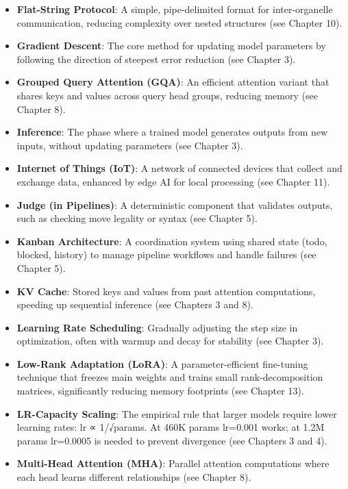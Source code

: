 \documentclass[
]{article}
\begin{document}
\begin{itemize}
  that processes features after attention, using ReLU activation (see
  Chapter 2).
\item
  \textbf{Flat-String Protocol}: A simple, pipe-delimited format for
  inter-organelle communication, reducing complexity over nested
  structures (see Chapter 10).
\item
  \textbf{Gradient Descent}: The core method for updating model
  parameters by following the direction of steepest error reduction (see
  Chapter 3).
\item
  \textbf{Grouped Query Attention (GQA)}: An efficient attention variant
  that shares keys and values across query head groups, reducing memory
  (see Chapter 8).
\item
  \textbf{Inference}: The phase where a trained model generates outputs
  from new inputs, without updating parameters (see Chapter 3).
\item
  \textbf{Internet of Things (IoT)}: A network of connected devices that
  collect and exchange data, enhanced by edge AI for local processing
  (see Chapter 11).
\item
  \textbf{Judge (in Pipelines)}: A deterministic component that
  validates outputs, such as checking move legality or syntax (see
  Chapter 5).
\item
  \textbf{Kanban Architecture}: A coordination system using shared state
  (todo, blocked, history) to manage pipeline workflows and handle
  failures (see Chapter 5).
\item
  \textbf{KV Cache}: Stored keys and values from past attention
  computations, speeding up sequential inference (see Chapters 3 and 8).
\item
  \textbf{Learning Rate Scheduling}: Gradually adjusting the step size
  in optimization, often with warmup and decay for stability (see
  Chapter 3).
\item
  \textbf{Low-Rank Adaptation (LoRA)}: A parameter-efficient fine-tuning
  technique that freezes main weights and trains small
  rank-decomposition matrices, significantly reducing memory footprints
  (see Chapter 13).
\item
  \textbf{LR-Capacity Scaling}: The empirical rule that larger models
  require lower learning rates: lr ∝ 1/√params. At 460K params lr=0.001
  works; at 1.2M params lr=0.0005 is needed to prevent divergence (see
  Chapters 3 and 4).
\item
  \textbf{Multi-Head Attention (MHA)}: Parallel attention computations
  where each head learns different relationships (see Chapter 8).

\end{itemize}
\end{document}
